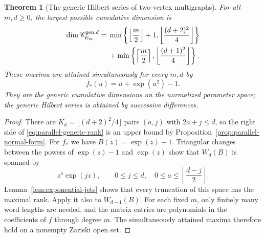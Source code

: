 \documentclass[reqno]{article}
\theoremstyle{plain} %
\newtheorem{theorem}{Theorem}[section]
\theoremstyle{definition}
\theoremstyle{remark}
\newcommand {\CC}{\mathscr{C}}
\numberwithin{equation}{section}
\begin{document}
\begin{theorem}[The generic Hilbert series of two-vertex multigraphs]
\label{thm:parallel-generic}
For all $m,d\ge0$, the largest possible cumulative dimension is
\begin{equation}\label{eq:parallel-generic-rank}
\begin{split}
 \dim\CC_{E_m}^{{\rm gen},d}
 ={}&\min\left\{\left\lfloor\frac m2\right\rfloor+1,
                    \left\lfloor\frac{(d+2)^2}{4}\right\rfloor\right\}\\
 &+\min\left\{\left\lceil\frac m2\right\rceil,
                    \left\lfloor\frac{(d+1)^2}{4}\right\rfloor\right\}.
\end{split}
\end{equation}
These maxima are attained simultaneously for every $m,d$ by
\[
 f_*(u)=u+\exp(u^2)-1.
\]
They are the generic cumulative dimensions on the normalized parameter
space; the generic Hilbert series is obtained by successive differences.
\end{theorem}
\begin{proof}
There are $K_d=\lfloor(d+2)^2/4\rfloor$ pairs $(a,j)$ with
$2a+j\le d$, so the right side of \eqref{eq:parallel-generic-rank}
is an upper bound by Proposition~\ref{prop:parallel-normal-form}.
For $f_*$ we have $B(z)=\exp(z)-1$. Triangular changes between the powers
of $\exp(z)-1$ and $\exp(z)$ show that $W_d(B)$ is spanned by
\[
 z^a\exp(jz),\qquad 0\le j\le d,\quad
 0\le a\le\left\lfloor\frac{d-j}{2}\right\rfloor.
\]
Lemma~\ref{lem:exponential-jets} shows that every truncation of this
space has the maximal rank. Apply it also to $W_{d-1}(B)$.
For each fixed $m$, only finitely many word lengths are needed, and the
matrix entries are polynomials in the coefficients of $f$ through degree $m$. The
simultaneously attained maxima therefore hold on a nonempty Zariski
open set.
\end{proof}
\end{document}
